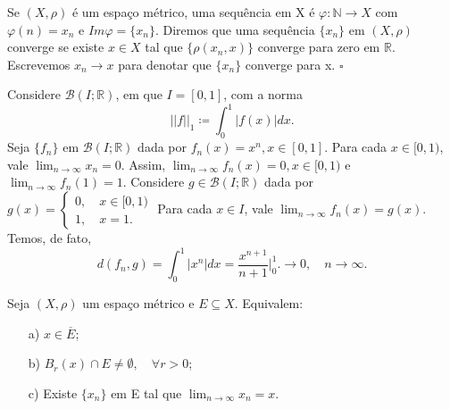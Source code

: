 \documentclass[metric_notes.tex]{subfiles}
\begin{document}
\begin{def*}
	Se \((X, \rho )\) é um espaço métrico, uma sequência em X é \(\varphi:\mathbb{N}\rightarrow X\) com \(\varphi(n) = x_{n}\) e
	\(Im\varphi = \{x_{n}\}\). Diremos que uma sequência \(\{x_{n}\}\) em \((X, \rho )\) converge se existe \(x\in X\)
	tal que \(\{\rho(x_{n}, x)\}\) converge para zero em \(\mathbb{R}\). Escrevemos \(x_{n}\rightarrow x\) para denotar que \(\{x_{n}\}\)
	converge para x. \(\square\)
\end{def*}
\begin{example}
	Considere \(\mathcal{B}(I; \mathbb{R})\), em que \(I = [0, 1]\), com a norma
	\[
		||f||_{1}\coloneqq \int_{0}^{1}|f(x)|dx.
	\]
	Seja \(\{f_{n}\}\) em \(\mathcal{B}(I; \mathbb{R})\) dada por \(f_{n}(x) =x^{n}, x\in[0,1]\). Para cada \(x\in[0, 1)\), vale
	\(\lim_{n\to \infty}x_{n} = 0\). Assim, \(\lim_{n\to \infty}f_{n}(x) = 0, x\in[0, 1)\) e \(\lim_{n\to \infty}f_{n}(1) = 1.\) Considere \(g\in \mathcal{B}(I; \mathbb{R})\)
	dada por \(g(x) = \left\{\begin{array}{ll}
		0,\quad x\in[0, 1) \\
		1,\quad x=1.
	\end{array}\right.\)
	Para cada \(x\in I\), vale \(\lim_{n\to \infty}f_{n}(x)=g(x)\). Temos, de fato,
	\[
		d(f_{n}, g)= \int_{0}^{1}|x^{n}|dx = \frac{x^{n+1}}{n+1}\biggl|_{0}^{1}\biggr.\longrightarrow 0,\quad n\to\infty.
	\]
\end{example}
\begin{prop*}
	Seja \((X, \rho )\) um espaço métrico e \(E\subseteq{X}\). Equivalem:
	\begin{itemize}
		\item[a)] \(x\in \overline{E}\);
		\item[b)] \(B_{r}(x)\cap E \neq\emptyset,\quad \forall r>0\);
		\item[c)] Existe \(\{x_{n}\}\) em E tal que \(\lim_{n\to \infty}x_{n} = x.\)
	\end{itemize}
\end{prop*}
\end{document}
